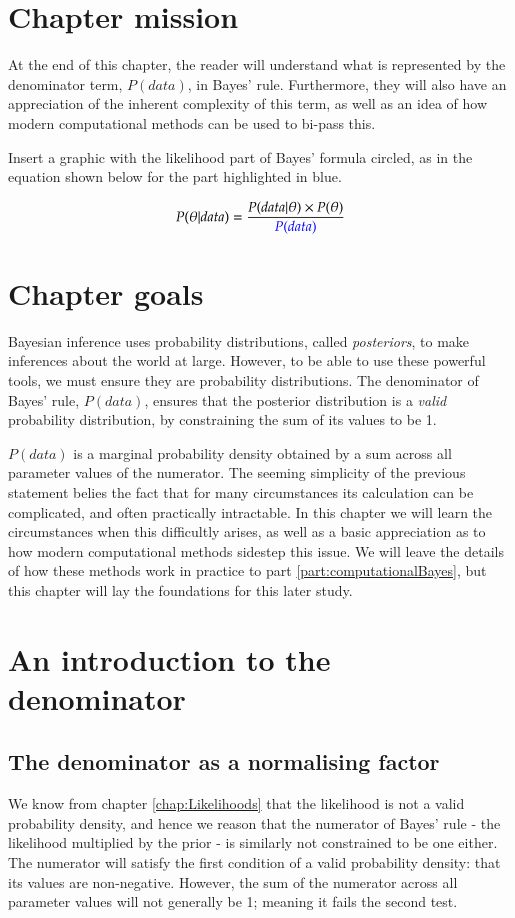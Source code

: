 \documentclass[11pt,fullpage]{book}
\begin{document}
\section{Chapter mission}
At the end of this chapter, the reader will understand what is represented by the denominator term, $P(data)$, in Bayes' rule. Furthermore, they will also have an appreciation of the inherent complexity of this term, as well as an idea of how modern computational methods can be used to bi-pass this.

Insert a graphic with the likelihood part of Bayes' formula circled, as in the equation shown below for the part highlighted in blue.

\begin{equation}
P(\theta|data) = \frac{P(data|\theta)\times P(\theta)}{{\color{blue}P(data)}}
\end{equation}\label{eq:Denominator_BayesHighlighted}


\section{Chapter goals}
Bayesian inference uses probability distributions, called \textit{posteriors}, to make inferences about the world at large. However, to be able to use these powerful tools, we must ensure they are probability distributions. The denominator of Bayes' rule, $P(data)$, ensures that the posterior distribution is a \textit{valid} probability distribution, by constraining the sum of its values to be 1. 

$P(data)$ is a marginal probability density obtained by a sum across all parameter values of the numerator. The seeming simplicity of the previous statement belies the fact that for many circumstances its calculation can be complicated, and often practically intractable. In this chapter we will learn the circumstances when this difficultly arises, as well as a basic appreciation as to how modern computational methods sidestep this issue. We will leave the details of how these methods work in practice to part \ref{part:computationalBayes}, but this chapter will lay the foundations for this later study.

\section{An introduction to the denominator}
\subsection{The denominator as a normalising factor}
We know from chapter \ref{chap:Likelihoods} that the likelihood is not a valid probability density, and hence we reason that the numerator of Bayes' rule - the likelihood multiplied by the prior - is similarly not constrained to be one either. The numerator will satisfy the first condition of a valid probability density: that its values are non-negative. However, the sum of the numerator across all parameter values will not generally be 1; meaning it fails the second test.
\end{document}
